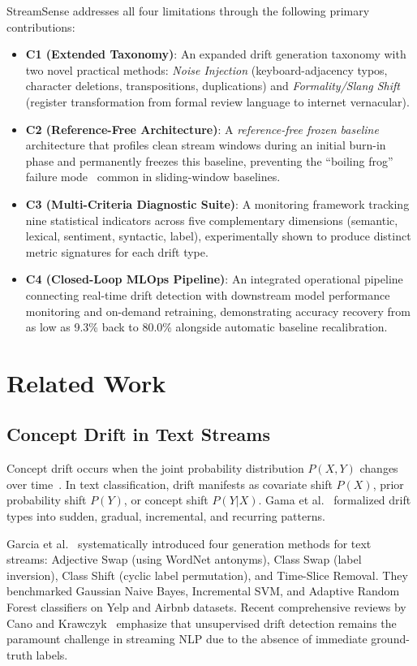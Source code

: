 \documentclass[conference]{IEEEtran}
\begin{document}
StreamSense addresses all four limitations through the following primary contributions:
\begin{itemize}
    \item \textbf{C1 (Extended Taxonomy)}: An expanded drift generation taxonomy with two novel practical methods: \textit{Noise Injection} (keyboard-adjacency typos, character deletions, transpositions, duplications) and \textit{Formality/Slang Shift} (register transformation from formal review language to internet vernacular).
    \item \textbf{C2 (Reference-Free Architecture)}: A \textit{reference-free frozen baseline} architecture that profiles clean stream windows during an initial burn-in phase and permanently freezes this baseline, preventing the ``boiling frog'' failure mode~\cite{bifet2007learning} common in sliding-window baselines.
    \item \textbf{C3 (Multi-Criteria Diagnostic Suite)}: A monitoring framework tracking nine statistical indicators across five complementary dimensions (semantic, lexical, sentiment, syntactic, label), experimentally shown to produce distinct metric signatures for each drift type.
    \item \textbf{C4 (Closed-Loop MLOps Pipeline)}: An integrated operational pipeline connecting real-time drift detection with downstream model performance monitoring and on-demand retraining, demonstrating accuracy recovery from as low as 9.3\% back to 80.0\% alongside automatic baseline recalibration.
\end{itemize}

\section{Related Work}

\subsection{Concept Drift in Text Streams}
Concept drift occurs when the joint probability distribution $P(X, Y)$ changes over time~\cite{gama2014survey, webb2016characterizing}. In text classification, drift manifests as covariate shift $P(X)$, prior probability shift $P(Y)$, or concept shift $P(Y|X)$. Gama et al.~\cite{gama2004learning} formalized drift types into sudden, gradual, incremental, and recurring patterns.

Garcia et al.~\cite{garcia2024methods} systematically introduced four generation methods for text streams: Adjective Swap (using WordNet antonyms), Class Swap (label inversion), Class Shift (cyclic label permutation), and Time-Slice Removal. They benchmarked Gaussian Naive Bayes, Incremental SVM, and Adaptive Random Forest classifiers on Yelp and Airbnb datasets. Recent comprehensive reviews by Cano and Krawczyk~\cite{cano2024concept} emphasize that unsupervised drift detection remains the paramount challenge in streaming NLP due to the absence of immediate ground-truth labels.
\end{document}
